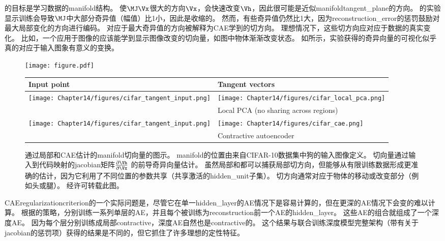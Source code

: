 的目标是学习数据的\gls{manifold}结构。
使$\MJ\Vx$很大的方向$\Vx$，会快速改变$\Vh$，因此很可能是近似\gls{manifold}\gls{tangent_plane}的方向。
\citet{Rifai+al-2011-small,Salah+al-2011-small}的实验显示训练会导致$\MJ$中大部分奇异值（幅值）比1小，因此是收缩的。
然而，有些奇异值仍然比1大，因为\gls{reconstruction_error}的惩罚鼓励对最大局部变化的方向进行编码。
对应于最大奇异值的方向被解释为\gls{CAE}学到的切方向。
理想情况下，这些切方向应对应于数据的真实变化。
比如，一个应用于图像的应该能学到显示图像改变的切向量，如图中物体渐渐改变状态。
如所示，实验获得的奇异向量的可视化似乎真的对应于输入图象有意义的变换。


\begin{figure}[ht]
\centering
\ifOpenSource
\centerline{\texttt{[image: figure.pdf]}}
\else
\begin{tabular}{p{.1\figwidth}|p{.86\figwidth}}
Input point & Tangent vectors\\
\hline 
\texttt{[image: Chapter14/figures/cifar\_tangent\_input.png]} & 
\texttt{[image: Chapter14/figures/cifar\_local\_pca.png]}\\
 & Local PCA (no sharing across regions)\\
 \hline
\texttt{[image: Chapter14/figures/cifar\_tangent\_input.png]} & 
\texttt{[image: Chapter14/figures/cifar\_cae.png]}\\
 & Contractive autoencoder\\
\end{tabular}
\fi
\caption{通过局部和\gls{CAE}估计的\gls{manifold}切向量的图示。
\gls{manifold}的位置由来自CIFAR-10数据集中狗的输入图像定义。
切向量通过输入到代码映射的\gls{jacobian}矩阵$\frac{\partial \Vh}{\partial \Vx}$ 的前导奇异向量估计。
虽然局部和都可以捕获局部切方向，但能够从有限训练数据形成更准确的估计，因为它利用了不同位置的参数共享（共享激活的\gls{hidden_unit}子集）。
切方向通常对应于物体的移动或改变部分（例如头或腿）。
经\citet{Dauphin-et-al-NIPS2011-small}许可转载此图。
}
\label{fig:chap14_cifar_cae}
\end{figure}


\gls{CAE}\gls{regularization}\gls{criterion}的一个实际问题是，尽管它在单一\gls{hidden_layer}的\gls{AE}情况下是容易计算的，但在更深的\gls{AE}情况下会变的难以计算。
根据\citet{Rifai+al-2011-small}的策略，分别训练一系列单层的\gls{AE}，并且每个被训练为\gls{reconstruction}前一个\gls{AE}的\gls{hidden_layer}。
这些\gls{AE}的组合就组成了一个深度\gls{AE}。
因为每个层分别训练成局部\gls{contractive}，深度\gls{AE}自然也是\gls{contractive}的。
这个结果与联合训练深度模型完整架构（带有关于\gls{jacobian}的惩罚项）获得的结果是不同的，但它抓住了许多理想的定性特征。


